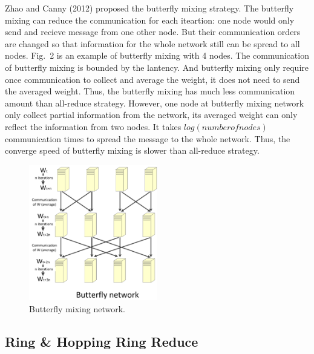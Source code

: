 \documentclass{article}
\begin{document}
Zhao and Canny (2012) proposed the butterfly mixing strategy. The butterfly mixing can reduce the communication for each iteartion: one node would only send and recieve message from one other node. But their communication orders are changed so that information for the whole network still can be spread to all nodes. Fig.~2 is an example of butterfly mixing with 4 nodes. The communication of butterfly mixing is bounded by the lantency. And butterfly mixing only require once communication to collect and average the weight, it does not need to send the averaged weight. Thus, the butterfly mixing has much less communication amount than all-reduce strategy. However, one node at butterfly mixing network only collect partial information from the network, its averaged weight can only reflect the information from two nodes. It takes $log(number of nodes)$ communication times to spread the message to the whole network. Thus, the converge speed of butterfly mixing is slower than all-reduce strategy. 
\begin{figure}[h!]
  
  \centering
    \includegraphics[width=0.5\textwidth]{butterfly.jpg}
    \caption{Butterfly mixing network.}
\end{figure}

\subsection{Ring \& Hopping Ring Reduce}
\end{document}
